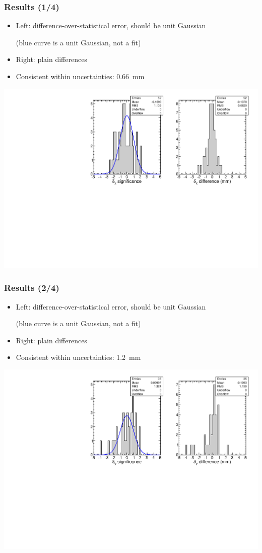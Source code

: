 \documentclass[compress]{beamer}
\begin{document}
\begin{frame}
\frametitle{Results (1/4)}
\begin{itemize}
\item Left: difference-over-statistical error, should be unit Gaussian

(blue curve is a unit Gaussian, not a fit)

\item Right: plain differences

\item Consistent within uncertainties: 0.66~mm
\end{itemize}

\includegraphics[width=\linewidth]{afterincident_x.pdf}
\end{frame}

\begin{frame}
\frametitle{Results (2/4)}
\begin{itemize}
\item Left: difference-over-statistical error, should be unit Gaussian

(blue curve is a unit Gaussian, not a fit)

\item Right: plain differences

\item Consistent within uncertainties: 1.2~mm
\end{itemize}

\includegraphics[width=\linewidth]{afterincident_y.pdf}
\end{frame}
\end{document}
